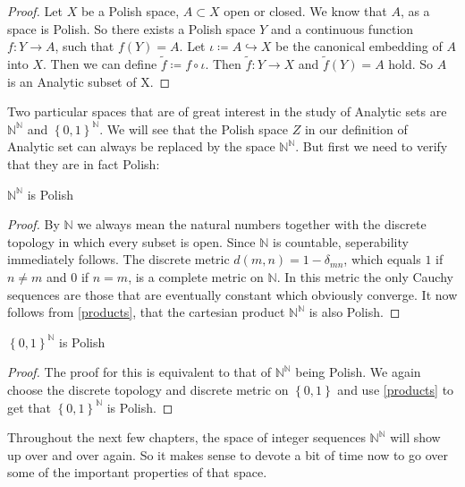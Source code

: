\documentclass[10pt, a4paper, titlepage]{article}
\numberwithin{equation}{section}
\begin{document}
\begin{proof}
Let $X$ be a Polish space, $A \subset X$ open or closed.
We know that $A$, as a space is Polish. So there exists a Polish space $Y$ and a continuous function  $f:Y\to A$, such that  $f(Y) = A$. 
	Let $\iota  \coloneq A \hookrightarrow X$ be the canonical embedding of  $A$ into  $X$. 
	Then we can define  $\tilde{f}  \coloneq f \circ \iota$. Then  $\tilde{f}:Y \to X $ and  $\tilde{f}(Y) = A$ hold. So  $A$ is an Analytic subset of X.
\end{proof}

Two particular spaces that are of great interest in the study of Analytic sets are $\mathbb{N}^{\mathbb{N}}$ and $\left\{ 0,1 \right\}^{\mathbb{N}} $.
We will see that the Polish space $Z$ in our definition of Analytic set can always be replaced by the space $\mathbb{N}^{\mathbb{N}}$. But first we need to verify that they are in fact Polish:

\begin{theorem}
	$\mathbb{N}^\mathbb{N}$ is Polish
\end{theorem}
\begin{proof}
By $\mathbb{N}$ we always mean the natural numbers together with the discrete topology in which every subset is open. Since $\mathbb{N}$ is countable, seperability immediately follows.
The discrete metric $d\left( m,n \right) = 1 - \delta_{mn} $, which equals $1$ if  $n \neq m$ and $0$ if $n=m$, is a complete metric on  $\mathbb{N}$.
In this metric the only Cauchy sequences are those that are eventually constant which obviously converge.
It now follows from \autoref{products}, that the cartesian product $\mathbb{N}^{\mathbb{N}}$ is also Polish.
\end{proof}

\begin{theorem}
	$\left\{ 0,1 \right\}^\mathbb{N}$ is Polish
\end{theorem}
\begin{proof}
	The proof for this is equivalent to that of $\mathbb{N}^{\mathbb{N}}$ being Polish. We again choose the discrete topology and discrete metric on $\left\{ 0,1 \right\} $ and use \autoref{products} to get that $\left\{ 0,1 \right\} ^{\mathbb{N}} $ is Polish.	
\end{proof}



Throughout the next few chapters, the space of integer sequences $\mathbb{N}^\mathbb{N}$ will show up
over and over again. So it makes sense to devote a bit of time now to go over
some of the important properties of that space.
\end{document}
